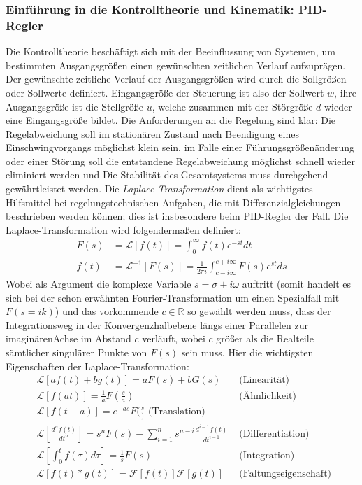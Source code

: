 \subsubsection{Einführung in die Kontrolltheorie und Kinematik: PID-Regler}
Die Kontrolltheorie beschäftigt sich mit der Beeinflussung von Systemen, um bestimmten
Ausgangsgrößen einen gewünschten zeitlichen Verlauf aufzuprägen\cite{regelungstechnik}.
Der gewünschte zeitliche Verlauf der Ausgangsgrößen wird durch die Sollgrößen oder Sollwerte
definiert. Eingangsgröße der Steuerung ist also der Sollwert $w$, ihre Ausgangsgröße ist die
Stellgröße $u$, welche zusammen mit der Störgröße $d$ wieder eine Eingangsgröße bildet. Die
Anforderungen an die Regelung sind klar: Die Regelabweichung soll im stationären Zustand
nach Beendigung
eines Einschwingvorgangs möglichst klein sein, im Falle einer Führungsgrößenänderung oder einer
Störung soll die entstandene Regelabweichung möglichst schnell wieder eliminiert werden und
Die Stabilität des Gesamtsystems muss durchgehend gewährtleistet werden.
Die \textit{Laplace-Transformation}\cite{regelungstechnik2} dient als wichtigstes Hilfsmittel
bei regelungstechnischen Aufgaben, die mit Differenzialgleichungen beschrieben werden können; dies
ist insbesondere beim PID-Regler der Fall. Die Laplace-Transformation wird folgendermaßen definiert:
\begin{align}
F(s) &= \mathcal{L}\left [f(t)\right ] = \int_{0}^{\infty}f(t)e^{-st}dt \\
f(t) &= \mathcal{L}^{-1}\left [F(s)\right ] =
\frac{1}{2\pi i} \int_{c - i\infty}^{c+ i\infty} F(s)e^{st}ds
\end{align}
Wobei als Argument die komplexe Variable $s=\sigma + i\omega$ auftritt (somit handelt es sich
bei der schon erwähnten Fourier-Transformation um einen Spezialfall mit $F(s = ik)$) und
das vorkommende $c\in \mathbb{R}$ so gewählt werden muss, dass der Integrationsweg in der
Konvergenzhalbebene längs einer Parallelen zur imaginärenAchse im Abstand $c$ verläuft, wobei
$c$ größer als die Realteile sämtlicher singulärer Punkte von $F(s)$ sein muss.
Hier die wichtigsten Eigenschaften der Laplace-Transformation:
\begin{align}
&\mathcal{L}\left [a f(t) + b g(t)\right ]
= a F(s) + b G(s)
&\mbox{ (Linearität) }\\
&\mathcal{L}\left [f(at)\right ]
= \frac{1}{a}F(\frac{s}{a})
&\mbox{ (Ähnlichkeit) }\\
&\mathcal{L}\left [f(t-a)\right ]
= e^{-as}F(\frac{s})
\mbox{ (Translation) }\\
&\mathcal{L}\left [\frac{d^nf(t)}{dt^n}\right ]
= s^nF(s) - \sum_{i=1}^{n}s^{n-i}\frac{d^{i-1}f(t)}{dt^{i-1}}
&\mbox{ (Differentiation) }\\
&\mathcal{L}\left [\int_{0}^{t}f(\tau)d\tau\right ]
= \frac{1}{s}F(s)
&\mbox{ (Integration) }\\
&\mathcal{L}\left [f(t) * g(t)\right ]
= \mathcal{F}\left [f(t)\right ]\mathcal{F}\left [g(t)\right ]
&\mbox{ (Faltungseigenschaft) }
\end{align}
